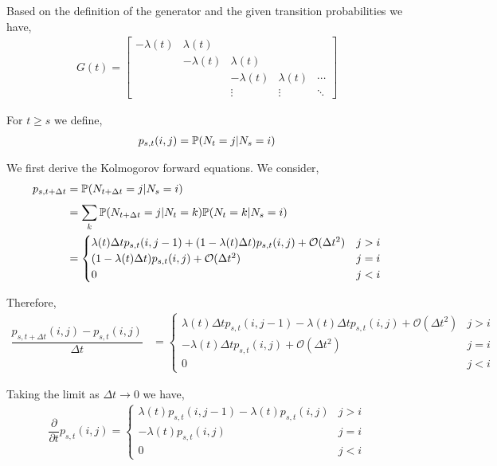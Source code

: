 \begin{solution}[Solution]
Based on the definition of the generator and the given transition probabilities we have,
\begin{align*}
    G(t) = 
    \left[\begin{array}{rrrrr}
        -\lambda(t) & \lambda(t) \\
        & -\lambda(t) & \lambda(t) \\
        & & -\lambda(t) & \lambda(t) & \cdots \\
        & & \vdots & \vdots & \ddots
    \end{array}\right]
\end{align*}

For \( t\geq s \) we define, 
\begin{align*}
    p_{s,t}(i,j) = \mathbb{P}( N_t = j | N_s = i)
\end{align*}

We first derive the Kolmogorov forward equations. We consider,
\begin{align*}
    p_{s,t+\Delta t} &= \mathbb{P}( N_{t+\Delta t} = j | N_s = i) \\
    &= \sum_{k}^{} \mathbb{P}(N_{t+\Delta t}=j | N_t = k)\mathbb{P}(N_{t}=k | N_s=i) \\
    &= \begin{cases}
        \lambda(t)\Delta t p_{s,t}(i,j-1) 
        +(1-\lambda(t)\Delta t) p_{s,t}(i,j) + \mathcal{O}(\Delta t^2) & j > i \\
        (1-\lambda(t)\Delta t) p_{s,t}(i,j) +\mathcal{O}(\Delta t^2) & j=i \\
        0 & j < i
    \end{cases}
\end{align*}

Therefore,
\begin{align*}
    \dfrac{p_{s,t+\Delta t}(i,j) - p_{s,t}(i,j)}{\Delta t} 
    &= \begin{cases}
        \lambda(t)\Delta t p_{s,t}(i,j-1) 
        -\lambda(t)\Delta t p_{s,t}(i,j) + \mathcal{O}(\Delta t^2) & j > i \\
        -\lambda(t)\Delta t p_{s,t}(i,j) +\mathcal{O}(\Delta t^2) & j=i \\
        0 & j < i
    \end{cases}
\end{align*}

Taking the limit as \( \Delta t \to 0  \) we have,
\begin{align*}
    \dfrac{\partial}{\partial t}p_{s,t}(i,j) = 
    \begin{cases}
        \lambda(t) p_{s,t}(i,j-1) 
        -\lambda(t)p_{s,t}(i,j) & j > i \\
        -\lambda(t)p_{s,t}(i,j) & j=i \\
        0 & j < i
    \end{cases}
\end{align*}


\end{solution}
